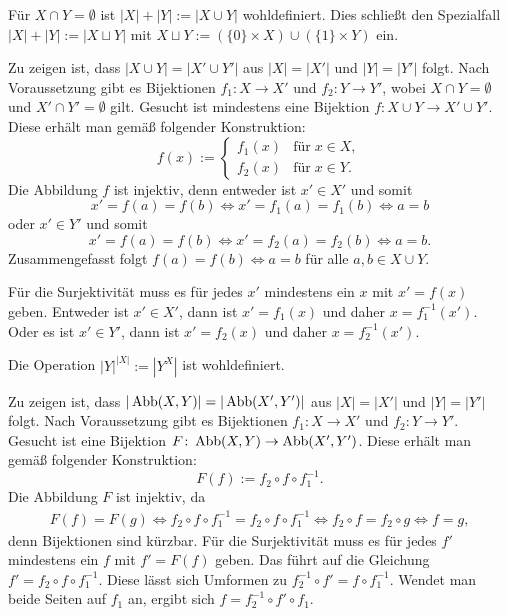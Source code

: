\begin{Definition}\newlinefirst
Für $X\cap Y=\emptyset$ ist $|X|+|Y|:=|X\cup Y|$ wohldefiniert.
Dies schließt den Spezialfall $|X|+|Y|:=|X\sqcup Y|$ mit
$X\sqcup Y:=(\{0\}\times X)\cup(\{1\}\times Y)$ ein.
\end{Definition}
\begin{Beweis}
Zu zeigen ist, dass $|X\cup Y|=|X'\cup Y'|$
aus $|X|=|X'|$ und $|Y|=|Y'|$ folgt. Nach Voraussetzung gibt
es Bijektionen $f_1\colon X\to X'$ und $f_2\colon Y\to Y'$, wobei
$X\cap Y=\emptyset$ und $X'\cap Y'=\emptyset$ gilt. Gesucht
ist mindestens eine Bijektion $f\colon X\cup Y\to X'\cup Y'$.
Diese erhält man gemäß folgender Konstruktion:
\[f(x):=\begin{cases}
f_1(x)&\text{für}\;x\in X,\\
f_2(x)&\text{für}\;x\in Y.
\end{cases}\]
Die Abbildung $f$ ist injektiv, denn entweder ist $x'\in X'$
und somit
\[x'=f(a)=f(b)\iff x'=f_1(a)=f_1(b)\iff a=b\]
oder $x'\in Y'$ und somit
\[x'=f(a)=f(b)\iff x'=f_2(a)=f_2(b)\iff a=b.\]
Zusammengefasst folgt $f(a)=f(b)\iff a=b$ für alle $a,b\in X\cup Y$.

Für die Surjektivität muss es für jedes $x'$ mindestens ein $x$ mit
$x'=f(x)$ geben. Entweder ist $x'\in X'$, dann ist $x'=f_1(x)$
und daher $x=f_1^{-1}(x')$. Oder es ist $x'\in Y'$, dann ist
$x'=f_2(x)$ und daher $x=f_2^{-1}(x')$.\;\qedsymbol
\end{Beweis}

\newpage
\begin{Definition}\newlinefirst
Die Operation $|Y|^{|X|}:=|Y^X|$ ist wohldefiniert.
\end{Definition}
\begin{Beweis}
Zu zeigen ist, dass $|\operatorname{Abb}(X,Y)|=|\operatorname{Abb}(X',Y')|$
aus $|X|=|X'|$ und $|Y|=|Y'|$ folgt. Nach Voraussetzung gibt
es Bijektionen $f_1\colon X\to X'$ und $f_2\colon Y\to Y'$.
Gesucht ist eine Bijektion $F\colon\operatorname{Abb}(X,Y)\to\operatorname{Abb}(X',Y')$.
Diese erhält man gemäß folgender Konstruktion:
\[F(f) := f_2\circ f\circ f_1^{-1}.\]
Die Abbildung $F$ ist injektiv, da
\begin{gather*}
F(f)=F(g) \iff f_2\circ f\circ f_1^{-1} = f_2\circ f\circ f_1^{-1}
\iff f_2\circ f = f_2\circ g\iff f=g,
\end{gather*}
denn Bijektionen sind kürzbar. Für die Surjektivität muss
es für jedes $f'$ mindestens ein $f$ mit $f'=F(f)$ geben.
Das führt auf die Gleichung $f'=f_2\circ f\circ f_1^{-1}$.
Diese lässt sich Umformen zu $f_2^{-1}\circ f'=f\circ f_1^{-1}$.
Wendet man beide Seiten auf $f_1$ an, ergibt sich
$f=f_2^{-1}\circ f'\circ f_1$.\;\qedsymbol
\end{Beweis}

